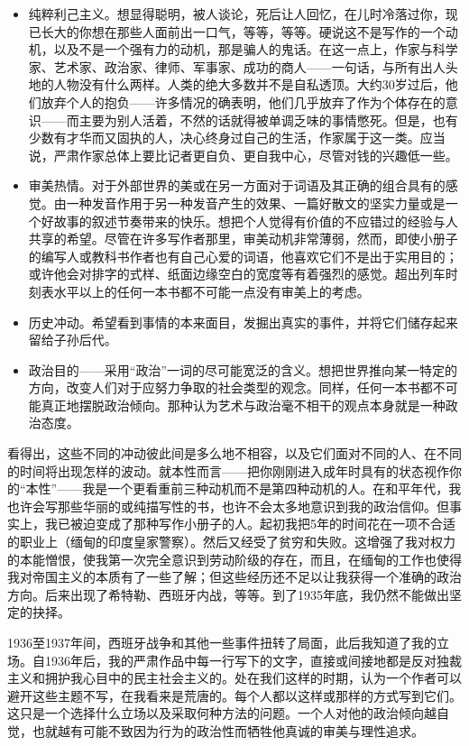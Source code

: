 \documentclass[12pt,a5paper]{ctexbook}
\begin{document}
\begin{itemize}
	\item 纯粹利己主义。想显得聪明，被人谈论，死后让人回忆，在儿时冷落过你，现已长大的你想在那些人面前出一口气，等等，等等。硬说这不是写作的一个动机，以及不是一个强有力的动机，那是骗人的鬼话。在这一点上，作家与科学家、艺术家、政治家、律师、军事家、成功的商人——一句话，与所有出人头地的人物没有什么两样。人类的绝大多数并不是自私透顶。大约30岁过后，他们放弃个人的抱负——许多情况的确表明，他们几乎放弃了作为个体存在的意识——而主要为别人活着，不然的话就得被单调乏味的事情憋死。但是，也有少数有才华而又固执的人，决心终身过自己的生活，作家属于这一类。应当说，严肃作家总体上要比记者更自负、更自我中心，尽管对钱的兴趣低一些。
	\item 审美热情。对于外部世界的美或在另一方面对于词语及其正确的组合具有的感觉。由一种发音作用于另一种发音产生的效果、一篇好散文的坚实力量或是一个好故事的叙述节奏带来的快乐。想把个人觉得有价值的不应错过的经验与人共享的希望。尽管在许多写作者那里，审美动机非常薄弱，然而，即使小册子的编写人或教科书作者也有自己心爱的词语，他喜欢它们不是出于实用目的；或许他会对排字的式样、纸面边缘空白的宽度等有着强烈的感觉。超出列车时刻表水平以上的任何一本书都不可能一点没有审美上的考虑。
	\item 历史冲动。希望看到事情的本来面目，发掘出真实的事件，并将它们储存起来留给子孙后代。
	\item 政治目的——采用“政治”一词的尽可能宽泛的含义。想把世界推向某一特定的方向，改变人们对于应努力争取的社会类型的观念。同样，任何一本书都不可能真正地摆脱政治倾向。那种认为艺术与政治毫不相干的观点本身就是一种政治态度。
\end{itemize}

看得出，这些不同的冲动彼此间是多么地不相容，以及它们面对不同的人、在不同的时间将出现怎样的波动。就本性而言——把你刚刚进入成年时具有的状态视作你的“本性”——我是一个更看重前三种动机而不是第四种动机的人。在和平年代，我也许会写那些华丽的或纯描写性的书，也许不会太多地意识到我的政治信仰。但事实上，我已被迫变成了那种写作小册子的人。起初我把5年的时间花在一项不合适的职业上（缅甸的印度皇家警察）。然后又经受了贫穷和失败。这增强了我对权力的本能憎恨，使我第一次完全意识到劳动阶级的存在，而且，在缅甸的工作也使得我对帝国主义的本质有了一些了解；但这些经历还不足以让我获得一个准确的政治方向。后来出现了希特勒、西班牙内战，等等。到了1935年底，我仍然不能做出坚定的抉择。

1936至1937年间，西班牙战争和其他一些事件扭转了局面，此后我知道了我的立场。自1936年后，我的严肃作品中每一行写下的文字，直接或间接地都是反对独裁主义和拥护我心目中的民主社会主义的。处在我们这样的时期，认为一个作者可以避开这些主题不写，在我看来是荒唐的。每个人都以这样或那样的方式写到它们。这只是一个选择什么立场以及采取何种方法的问题。一个人对他的政治倾向越自觉，也就越有可能不致因为行为的政治性而牺牲他真诚的审美与理性追求。
\end{document}
